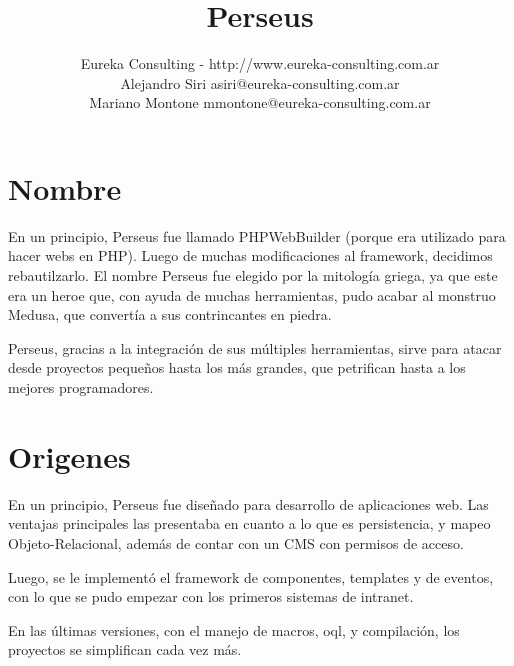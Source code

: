 \documentclass[a4paper,10pt,acm]{article}
\title{Perseus}
\date{}
\author{Eureka Consulting - http://www.eureka-consulting.com.ar \\
		Alejandro Siri asiri@eureka-consulting.com.ar\\
		Mariano Montone mmontone@eureka-consulting.com.ar}
\begin{document}
\maketitle


\section{Nombre}

En un principio, Perseus fue llamado PHPWebBuilder (porque era utilizado para hacer webs en PHP). Luego de muchas modificaciones al framework, decidimos
rebautilzarlo. El nombre Perseus fue elegido por la mitología griega, ya que este era un heroe que, con ayuda de muchas herramientas, pudo acabar
al monstruo Medusa, que convertía a sus contrincantes en piedra.

Perseus, gracias a la integración de sus múltiples herramientas, sirve para atacar desde proyectos pequeños hasta los más grandes, que
petrifican hasta a los mejores programadores.

\section{Origenes}

En un principio, Perseus fue diseñado para desarrollo de aplicaciones web. Las ventajas principales
las presentaba en cuanto a lo que es persistencia, y mapeo Objeto-Relacional, además de contar con un
CMS con permisos de acceso.

Luego, se le implementó el framework de componentes, templates y de eventos, con lo que se pudo empezar con los primeros sistemas de intranet.

En las últimas versiones, con el manejo de macros, oql, y compilación, los proyectos se simplifican cada vez más.
\end{document}
